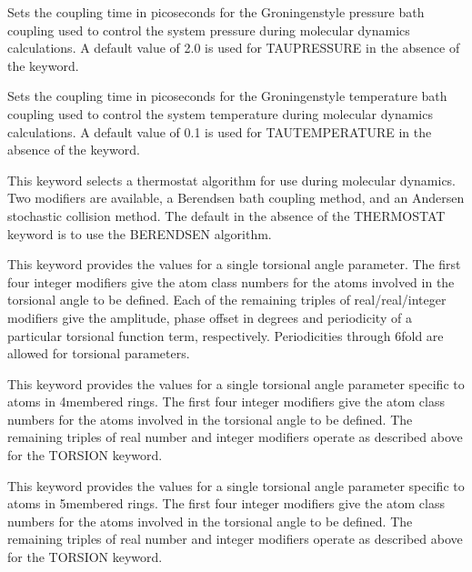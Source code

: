 \documentclass[letterpaper,11pt,english]{sphinxmanual}
\begin{document}
  Sets the coupling time in picoseconds for the Groningen\sphinxhyphen{}style pressure bath coupling used to control the system pressure during molecular dynamics calculations. A default value of 2.0 is used for TAU\sphinxhyphen{}PRESSURE in the absence of the keyword.

  Sets the coupling time in picoseconds for the Groningen\sphinxhyphen{}style temperature bath coupling used to control the system temperature during molecular dynamics calculations. A default value of 0.1 is used for TAU\sphinxhyphen{}TEMPERATURE in the absence of the keyword.

  This keyword selects a thermostat algorithm for use during molecular dynamics. Two modifiers are available, a Berendsen bath coupling method, and an Andersen stochastic collision method. The default in the absence of the THERMOSTAT keyword is to use the BERENDSEN algorithm.

  This keyword provides the values for a single torsional angle parameter. The first four integer modifiers give the atom class numbers for the atoms involved in the torsional angle to be defined. Each of the remaining triples of real/real/integer modifiers give the amplitude, phase offset in degrees and periodicity of a particular torsional function term, respectively. Periodicities through 6\sphinxhyphen{}fold are allowed for torsional parameters.

  This keyword provides the values for a single torsional angle parameter specific to atoms in 4\sphinxhyphen{}membered rings. The first four integer modifiers give the atom class numbers for the atoms involved in the torsional angle to be defined. The remaining triples of real number and integer modifiers operate as described above for the TORSION keyword.

  This keyword provides the values for a single torsional angle parameter specific to atoms in 5\sphinxhyphen{}membered rings. The first four integer modifiers give the atom class numbers for the atoms involved in the torsional angle to be defined. The remaining triples of real number and integer modifiers operate as described above for the TORSION keyword.
\end{document}
